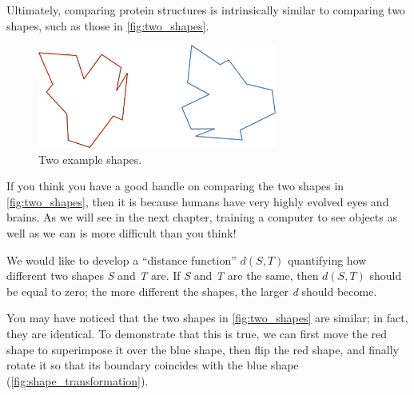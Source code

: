 Ultimately, comparing protein structures is intrinsically similar to comparing two shapes, such as those in \autoref{fig:two_shapes}.\\

\begin{qbox}\end{qbox}

\begin{figure}[h]
	\centering
	\mySfFamily
	\includegraphics[width = 0.7\textwidth]{../images/two_shapes.png}
	\caption{Two example shapes.}
	\label{fig:two_shapes}
\end{figure}

If you think you have a good handle on comparing the two shapes in \autoref{fig:two_shapes}, then it is because humans have very highly evolved eyes and brains. As we will see in the next chapter, training a computer to see objects as well as we can is more difficult than you think!

We would like to develop a ``distance function'' $d(S, T)$ quantifying how different two shapes \textit{S} and \textit{T} are. If \textit{S} and \textit{T} are the same, then $d(S, T)$ should be equal to zero; the more different the shapes, the larger \textit{d} should become.

You may have noticed that the two shapes in \autoref{fig:two_shapes} are similar; in fact, they are identical. To demonstrate that this is true, we can first move the red shape to superimpose it over the blue shape, then flip the red shape, and finally rotate it so that its boundary coincides with the blue shape (\autoref{fig:shape_transformation}).

